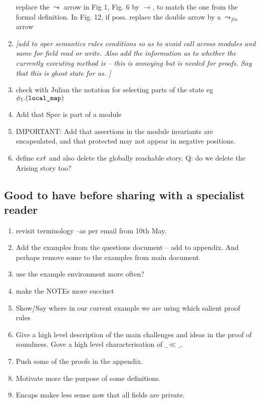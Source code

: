 \documentclass[acmsmall,review,anonymous]{acmart}\settopmatter{printfolios=true}
\begin{document}
\begin{enumerate}
replace the $\leadsto$ arrow in Fig 1, Fig. 6 by $\rightarrow$, to match the one from the formal definition. In Fig. 12, if poss. replace the double arrow by a $\leadsto_{fin}$ arrow 

\item
\sl[add to oper semantics rules conditions so as to avoid call across modules and same for field read or write. Also add the information as to whether the currently executing  method is  -- this is annoying but is needed for proofs. Say that this is ghost state for us.
]
\item
check with Julian the notation for selecting parts of the state eg $\phi_1.(\mbox{\normalfont{\texttt{local\_map}}})$

\item
Add that Spec is part of a module

\item
IMPORTANT: Add that assertions in the module invariants are encapsulated, and that protected may not appear in negative positions.

\item
   define $ext$ and also delete the globally reachable story. Q: do we delete the Arising story too? 

\end{enumerate}

 \subsection{Good to have before sharing with a specialist reader}

\begin{enumerate}
\item
revisit terminology --as per email from 10th May.
\item
Add the examples from the questions document -- add to appendix. And perhaps remove some to the examples from main document.

\item
use the example environment more often?

\item
make the NOTEs more succinct

\item
Show/Say where in our current example we are using which salient proof rules

\item
Give a high level description of the main challenges and ideas in the proof of soundness. Gove a high level characterisation of $\_\ll\_$.

\item
Push some of the proofs in the appendix.

\item
Motivate more the purpose of some definitions.

\item
Encaps makes less sense now that all fields are private. 

\end{enumerate}
\end{document}
